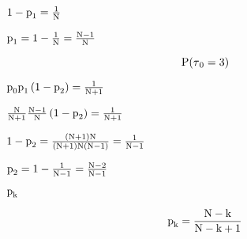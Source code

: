 {\begin{uebsp}
\begin{Answer}
{$\normalsubformula{\text{1}}-\normalsubformula{\text{p}}_{\normalsubformula{\text{1}}}=\frac{\normalsubformula{\text{1}}}{\normalsubformula{\text{N}}}$\newline

$\normalsubformula{\text{p}}_{\normalsubformula{\text{1}}}=\normalsubformula{\text{1}}-\frac{\normalsubformula{\text{1}}}{\normalsubformula{\text{N}}}=\frac{\normalsubformula{\text{N}}-\normalsubformula{\text{1}}}{\normalsubformula{\text{N}}}$\par}

\begin{equation*}
\normalsubformula{\text{P}}(\normalsubformula{\text{$\tau
$}}_{\normalsubformula{\text{0}}}=\normalsubformula{\text{3}})
\end{equation*}
{\centering 
$\normalsubformula{\text{p}}_{\normalsubformula{\text{0}}}\normalsubformula{\text{p}}_{\normalsubformula{\text{1}}}\left(\normalsubformula{\text{1}}-\normalsubformula{\text{p}}_{\normalsubformula{\text{2}}}\right)=\frac{\normalsubformula{\text{1}}}{\normalsubformula{\text{N}}+\normalsubformula{\text{1}}}$\newline

$\frac{\normalsubformula{\text{N}}}{\normalsubformula{\text{N}}+\normalsubformula{\text{1}}}\frac{\normalsubformula{\text{N}}-\normalsubformula{\text{1}}}{\normalsubformula{\text{N}}}\left(\normalsubformula{\text{1}}-\normalsubformula{\text{p}}_{\normalsubformula{\text{2}}}\right)=\frac{\normalsubformula{\text{1}}}{\normalsubformula{\text{N}}+\normalsubformula{\text{1}}}$\newline

$\normalsubformula{\text{1}}-\normalsubformula{\text{p}}_{\normalsubformula{\text{2}}}=\frac{\left(\normalsubformula{\text{N}}+\normalsubformula{\text{1}}\right)\normalsubformula{\text{N}}}{\left(\normalsubformula{\text{N}}+\normalsubformula{\text{1}}\right)\normalsubformula{\text{N}}\left(\normalsubformula{\text{N}}-\normalsubformula{\text{1}}\right)}=\frac{\normalsubformula{\text{1}}}{\normalsubformula{\text{N}}-\normalsubformula{\text{1}}}$\newline

$\normalsubformula{\text{p}}_{\normalsubformula{\text{2}}}=\normalsubformula{\text{1}}-\frac{\normalsubformula{\text{1}}}{\normalsubformula{\text{N}}-\normalsubformula{\text{1}}}=\frac{\normalsubformula{\text{N}}-\normalsubformula{\text{2}}}{\normalsubformula{\text{N}}-\normalsubformula{\text{1}}}$\par}

$\normalsubformula{\text{p}}_{\normalsubformula{\text{k}}}\normalsubformula{\text{~}}$

\begin{equation*}
\normalsubformula{\text{p}}_{\normalsubformula{\text{k}}}=\frac{\normalsubformula{\text{N}}-\normalsubformula{\text{k}}}{\normalsubformula{\text{N}}-\normalsubformula{\text{k}}+\normalsubformula{\text{1}}}
\end{equation*}
\end{Answer}
\end{uebsp}
}
